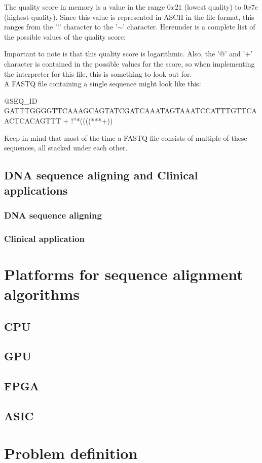 The quality score in memory is a value in the range $0x21$ (lowest quality) to $0x7e$ (highest quality). Since this value is represented in ASCII in the file format, this ranges from the '$!$' character to the '$\mathtt{\sim}$' character. Hereunder is a complete list of the possible values of the quality score:

\begin{lcverbatim}
!"#$%
[\]^_`abcdefghijklmnopqrstuvwxyz{|}~
\end{lcverbatim}


Important to note is that this quality score is logarithmic. Also, the '$@$' and '$+$' character is contained in the possible values for the score, so when implementing the interpreter for this file, this is something to look out for.\\


A FASTQ file containing a single sequence might look like this:


\begin{lcverbatim}
@SEQ_ID
GATTTGGGGTTCAAAGCAGTATCGATCAAATAGTAAATCCATTTGTTCAACTCACAGTTT
+
!''*((((***+))%
\end{lcverbatim}

Keep in mind that most of the time a FASTQ file consists of multiple of these sequences, all stacked under each other.

\subsection{DNA sequence aligning and Clinical applications}

\subsubsection{DNA sequence aligning}



\subsubsection{Clinical application}



\section{Platforms for sequence alignment algorithms}

\subsection{CPU}
\subsection{GPU}
\subsection{FPGA}
\subsection{ASIC}

\section{Problem definition}